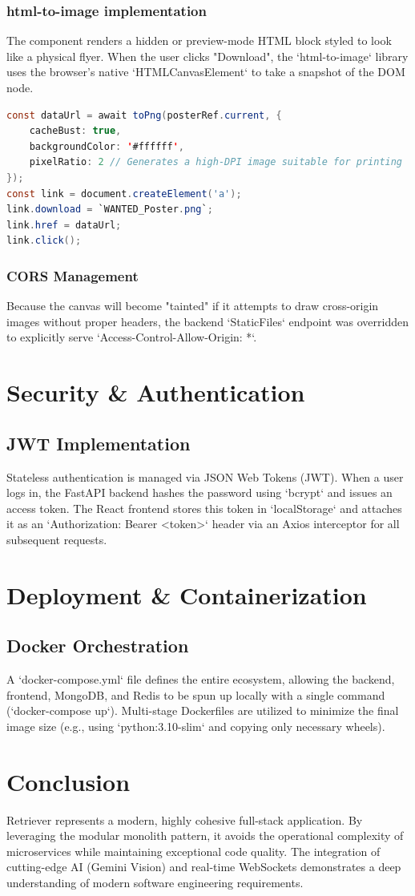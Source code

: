 \documentclass[12pt,a4paper]{report}
\begin{document}
\subsection{html-to-image implementation}
The component renders a hidden or preview-mode HTML block styled to look like a physical flyer. When the user clicks "Download", the `html-to-image` library uses the browser's native `HTMLCanvasElement` to take a snapshot of the DOM node.
\begin{lstlisting}[language=Java, caption=Canvas Extraction Logic]
const dataUrl = await toPng(posterRef.current, {
    cacheBust: true,
    backgroundColor: '#ffffff',
    pixelRatio: 2 // Generates a high-DPI image suitable for printing
});
const link = document.createElement('a');
link.download = `WANTED_Poster.png`;
link.href = dataUrl;
link.click();
\end{lstlisting}
\subsection{CORS Management}
Because the canvas will become "tainted" if it attempts to draw cross-origin images without proper headers, the backend `StaticFiles` endpoint was overridden to explicitly serve `Access-Control-Allow-Origin: *`.

\chapter{Security \& Authentication}
\section{JWT Implementation}
Stateless authentication is managed via JSON Web Tokens (JWT). When a user logs in, the FastAPI backend hashes the password using `bcrypt` and issues an access token.
The React frontend stores this token in `localStorage` and attaches it as an `Authorization: Bearer <token>` header via an Axios interceptor for all subsequent requests.

\chapter{Deployment \& Containerization}
\section{Docker Orchestration}
A `docker-compose.yml` file defines the entire ecosystem, allowing the backend, frontend, MongoDB, and Redis to be spun up locally with a single command (`docker-compose up`).
Multi-stage Dockerfiles are utilized to minimize the final image size (e.g., using `python:3.10-slim` and copying only necessary wheels).

\chapter{Conclusion}
Retriever represents a modern, highly cohesive full-stack application. By leveraging the modular monolith pattern, it avoids the operational complexity of microservices while maintaining exceptional code quality. The integration of cutting-edge AI (Gemini Vision) and real-time WebSockets demonstrates a deep understanding of modern software engineering requirements.
\end{document}
